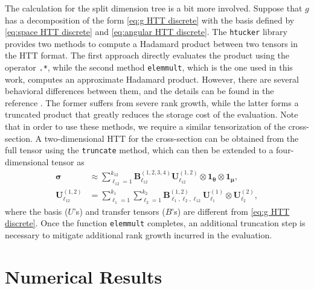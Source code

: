 \documentclass[onefignum,onetabnum]{siamart220329}
\begin{document}
The calculation for the split dimension tree is a bit more involved. Suppose that $g$ has a decomposition of the form \eqref{eq:g HTT discrete} with the basis defined by \eqref{eq:space HTT discrete} and \eqref{eq:angular HTT discrete}. The \texttt{htucker} library \cite{kressner2012htucker} provides two methods to compute a Hadamard product between two tensors in the HTT format. The first approach directly evaluates the product using the operator \texttt{.*}, while the second method \texttt{elem\textunderscore mult}, which is the one used in this work, computes an approximate Hadamard product. However, there are several behavioral differences between them, and the details can be found in the reference \cite{kressner2012htucker}. The former suffers from severe rank growth, while the latter forms a truncated product that greatly reduces the storage cost of the evaluation. Note that in order to use these methods, we require a similar tensorization of the cross-section. A two-dimensional HTT for the cross-section can be obtained from the full tensor using the \texttt{truncate} method, which can then be extended to a four-dimensional tensor as
\begin{align*}
    \boldsymbol{\sigma} &\approx \sum_{\ell_{12} = 1}^{k_{12}} \mathbf{B}_{\ell_{12}}^{(1,2,3,4)} \mathbf{U}_{\ell_{12}}^{(1,2)} \otimes \mathbf{1}_{\boldsymbol{\theta}} \otimes \mathbf{1}_{\boldsymbol{\mu}}, \\
    \mathbf{U}_{\ell_{12}}^{(1,2)} &= \sum_{\ell_{1}=1}^{k_{1}} \sum_{\ell_{2}=1}^{k_{2}} \mathbf{B}_{\ell_{1},\ell_{2},\ell_{12}}^{(1,2)}  \mathbf{U}_{\ell_{1}}^{(1)} \otimes \mathbf{U}_{\ell_{2}}^{(2)},
\end{align*}
where the basis ($U$'s) and transfer tensors ($B$'s) are different from \eqref{eq:g HTT discrete}. Once the function \texttt{elem\textunderscore mult} completes, an additional truncation step is necessary to mitigate additional rank growth incurred in the evaluation.








%
%
\section{Numerical Results}
\label{sec:results}
\end{document}
